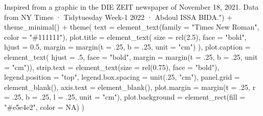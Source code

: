 \documentclass[
]{book}
\newenvironment{Shaded}{\begin{snugshade}}{\end{snugshade}}
\newcommand{\AttributeTok}[1]{\textcolor[rgb]{0.77,0.63,0.00}{#1}}
\newcommand{\ConstantTok}[1]{\textcolor[rgb]{0.00,0.00,0.00}{#1}}
\newcommand{\DecValTok}[1]{\textcolor[rgb]{0.00,0.00,0.81}{#1}}
\newcommand{\FloatTok}[1]{\textcolor[rgb]{0.00,0.00,0.81}{#1}}
\newcommand{\FunctionTok}[1]{\textcolor[rgb]{0.00,0.00,0.00}{#1}}
\newcommand{\NormalTok}[1]{#1}
\newcommand{\SpecialCharTok}[1]{\textcolor[rgb]{0.00,0.00,0.00}{#1}}
\newcommand{\StringTok}[1]{\textcolor[rgb]{0.31,0.60,0.02}{#1}}
\begin{document}
\begin{Shaded}
\begin{Highlighting}[]
\StringTok{                  Inspired from a graphic in the DIE ZEIT newspaper of November 18, 2021.}
\StringTok{                  Data from NY Times · Tidytuesday Week{-}1 2022 · Abdoul ISSA BIDA."}\NormalTok{) }\SpecialCharTok{+}
  \FunctionTok{theme\_minimal}\NormalTok{() }\SpecialCharTok{+}
  \FunctionTok{theme}\NormalTok{(}
    \AttributeTok{text =} \FunctionTok{element\_text}\NormalTok{(}\AttributeTok{family =} \StringTok{"Times New Roman"}\NormalTok{, }
                        \AttributeTok{color =} \StringTok{"\#111111"}\NormalTok{),}
    \AttributeTok{plot.title =} \FunctionTok{element\_text}\NormalTok{(}
      \AttributeTok{size =} \FunctionTok{rel}\NormalTok{(}\FloatTok{2.5}\NormalTok{),}
      \AttributeTok{face =} \StringTok{"bold"}\NormalTok{,}
      \AttributeTok{hjust =} \FloatTok{0.5}\NormalTok{,}
      \AttributeTok{margin =} \FunctionTok{margin}\NormalTok{(}\AttributeTok{t =}\NormalTok{ .}\DecValTok{25}\NormalTok{, }
                      \AttributeTok{b =}\NormalTok{ .}\DecValTok{25}\NormalTok{, }
                      \AttributeTok{unit =} \StringTok{"cm"}\NormalTok{)}
\NormalTok{    ),}
    \AttributeTok{plot.caption =} \FunctionTok{element\_text}\NormalTok{(}
      \AttributeTok{hjust =}\NormalTok{ .}\DecValTok{5}\NormalTok{,}
      \AttributeTok{face =} \StringTok{"bold"}\NormalTok{,}
      \AttributeTok{margin =} \FunctionTok{margin}\NormalTok{(}\AttributeTok{t =}\NormalTok{ .}\DecValTok{25}\NormalTok{, }
                      \AttributeTok{b =}\NormalTok{ .}\DecValTok{25}\NormalTok{, }
                      \AttributeTok{unit =} \StringTok{"cm"}\NormalTok{)),}
    \AttributeTok{strip.text =} \FunctionTok{element\_text}\NormalTok{(}\AttributeTok{size =} \FunctionTok{rel}\NormalTok{(}\FloatTok{0.75}\NormalTok{), }
                              \AttributeTok{face =} \StringTok{"bold"}\NormalTok{),}
    \AttributeTok{legend.position =} \StringTok{"top"}\NormalTok{,}
    \AttributeTok{legend.box.spacing =} \FunctionTok{unit}\NormalTok{(.}\DecValTok{25}\NormalTok{, }\StringTok{"cm"}\NormalTok{),}
    \AttributeTok{panel.grid =} \FunctionTok{element\_blank}\NormalTok{(),}
    \AttributeTok{axis.text =} \FunctionTok{element\_blank}\NormalTok{(),}
    \AttributeTok{plot.margin =} \FunctionTok{margin}\NormalTok{(}\AttributeTok{t =}\NormalTok{ .}\DecValTok{25}\NormalTok{, }
                         \AttributeTok{r =}\NormalTok{ .}\DecValTok{25}\NormalTok{, }
                         \AttributeTok{b =}\NormalTok{ .}\DecValTok{25}\NormalTok{, }
                         \AttributeTok{l =}\NormalTok{ .}\DecValTok{25}\NormalTok{, }
                         \AttributeTok{unit =} \StringTok{"cm"}\NormalTok{),}
    \AttributeTok{plot.background =} \FunctionTok{element\_rect}\NormalTok{(}\AttributeTok{fill =} \StringTok{"\#e5e4e2"}\NormalTok{, }
                                   \AttributeTok{color =} \ConstantTok{NA}\NormalTok{)}
\NormalTok{  )}
\end{Highlighting}
\end{Shaded}
\end{document}
